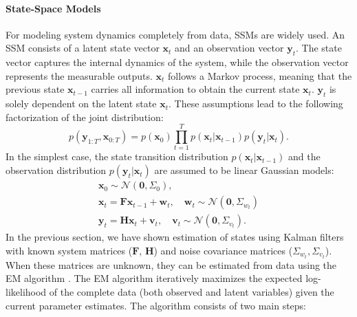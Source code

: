 \paragraph{State-Space Models}
For modeling system dynamics completely from data, \acfp{SSM} \citep{Durbin2012} are widely used. An \ac{SSM} consists of a latent state vector $\boldsymbol{x}_t$ and an observation vector $\boldsymbol{y}_t$. The state vector captures the internal dynamics of the system, while the observation vector represents the measurable outputs. $\boldsymbol{x}_t$ follows a Markov process, meaning that the previous state $\boldsymbol{x}_{t-1}$ carries all information to obtain the current state $\boldsymbol{x}_t$. $\boldsymbol{y}_t$ is solely dependent on the latent state $\boldsymbol{x}_t$. These assumptions lead to the following factorization of the joint distribution:
\begin{equation}
    p(\boldsymbol{y}_{1:T}, \boldsymbol{x}_{0:T}) = p(\boldsymbol{x}_0) \prod_{t=1}^{T}p(\boldsymbol{x}_t|\boldsymbol{x}_{t-1})p(\boldsymbol{y}_t|\boldsymbol{x}_t).
\end{equation}
In the simplest case, the state transition distribution $p(\boldsymbol{x}_t|\boldsymbol{x}_{t-1})$ and the observation distribution $p(\boldsymbol{y}_t|\boldsymbol{x}_t)$ are assumed to be linear Gaussian models:
\begin{subequations}
    \begin{gather}
        \boldsymbol{x}_0\sim\mathcal{N}(\boldsymbol{0}, \Sigma_0), \\
        \boldsymbol{x}_t=\boldsymbol{F}\boldsymbol{x}_{t-1}+\boldsymbol{w}_t, \quad \boldsymbol{w}_t\sim\mathcal{N}(\boldsymbol{0},\Sigma_{w_t})\\
        \boldsymbol{y}_t=\boldsymbol{H}\boldsymbol{x}_t+\boldsymbol{v}_t, \quad \boldsymbol{v}_t\sim\mathcal{N}(\boldsymbol{0},\Sigma_{v_t}).
    \end{gather}
\end{subequations}
In the previous section, we have shown estimation of states using Kalman filters with known system matrices ($\boldsymbol{F}$, $\boldsymbol{H}$) and noise covariance matrices ($\Sigma_{w_t}, \Sigma_{v_t}$). When these matrices are unknown, they can be estimated from data using the \ac{EM} algorithm \citep{Dempster1977}. The \ac{EM} algorithm iteratively maximizes the expected log-likelihood of the complete data (both observed and latent variables) given the current parameter estimates. The algorithm consists of two main steps:
